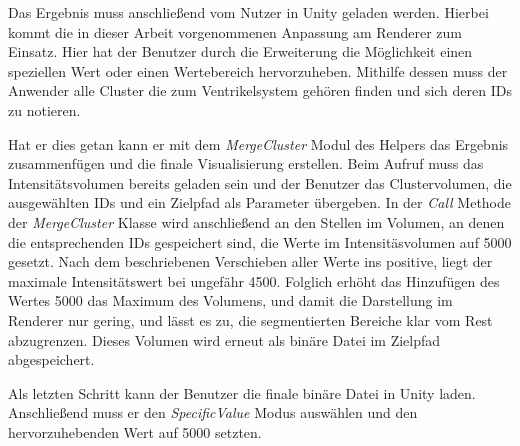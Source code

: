 Das Ergebnis muss anschließend vom Nutzer in Unity geladen werden.
\newline
Hierbei kommt die in dieser Arbeit vorgenommenen Anpassung am Renderer zum Einsatz.
\newline
Hier hat der Benutzer durch die Erweiterung die Möglichkeit einen speziellen Wert oder einen Wertebereich hervorzuheben.
\newline
Mithilfe dessen muss der Anwender alle Cluster die zum Ventrikelsystem gehören finden und sich deren IDs zu notieren.


Hat er dies getan kann er mit dem \textit{MergeCluster} Modul des Helpers das Ergebnis zusammenfügen und die finale Visualisierung erstellen.
\newline
Beim Aufruf muss das Intensitätsvolumen bereits geladen sein und der Benutzer das Clustervolumen, die ausgewählten IDs und ein Zielpfad als Parameter übergeben.
\newline
In der \textit{Call} Methode der \textit{MergeCluster} Klasse wird anschließend an den Stellen im Volumen, an denen die entsprechenden IDs gespeichert sind, die Werte im Intensitäsvolumen auf 5000 gesetzt.
\newline
Nach dem beschriebenen Verschieben aller Werte ins positive, liegt der maximale Intensitätswert bei ungefähr 4500. Folglich erhöht das Hinzufügen des Wertes 5000 das Maximum des Volumens, und damit die Darstellung im Renderer nur gering, und lässt es zu, die segmentierten Bereiche klar vom Rest abzugrenzen. Dieses Volumen wird erneut als binäre Datei im Zielpfad abgespeichert.


Als letzten Schritt kann der Benutzer die finale binäre Datei in Unity laden. Anschließend muss er den \textit{SpecificValue} Modus auswählen und den hervorzuhebenden Wert auf 5000 setzten.













































